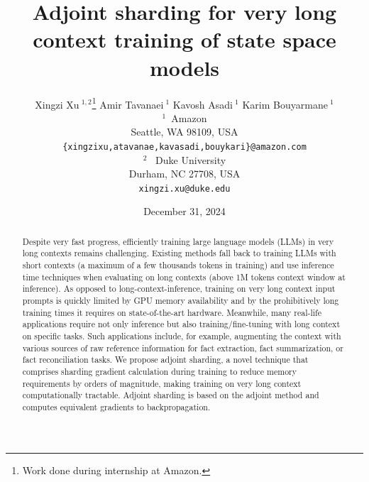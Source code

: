 \documentclass{article}
\title{Adjoint sharding for very long context training of state space models}
\author{
    Xingzi Xu$\ ^{1,2}$\thanks {Work done during internship at Amazon.}
    \And
    Amir Tavanaei$\ ^{1}$
    \And 
    Kavosh Asadi$\ ^{1}$
    \And 
    Karim Bouyarmane$\ ^{1}$
    \AND\\
    $^{1}$\ Amazon \\ Seattle, WA 98109, USA \\ \texttt{\{xingzixu,atavanae,kavasadi,bouykari\}@amazon.com}
    \And \\
    $^{2}$ \ Duke University \\ Durham, NC 27708, USA
    \\\texttt{xingzi.xu@duke.edu}
}
\begin{document}
\makeatletter
\renewcommand{\today}{December 31, 2024}
\makeatother
\date{\today}
\maketitle

\vspace{2em}  %
\setcounter{footnote}{2}

\begin{abstract}
Despite very fast progress, efficiently training large language models (LLMs) in very long contexts remains challenging.
Existing methods fall back to training LLMs with short contexts (a maximum of a few thousands tokens in training) and use inference time techniques when evaluating on long contexts (above 1M tokens context window at inference). 
As opposed to long-context-inference, training on very long context input prompts is quickly limited by GPU memory availability and by the prohibitively long training times it requires on state-of-the-art hardware.
Meanwhile, many real-life applications require not only inference but also training/fine-tuning with long context on specific tasks. Such applications include, for example, augmenting the context with various sources of raw reference information for fact extraction, fact summarization, or fact reconciliation tasks. 
We propose adjoint sharding, a novel technique that comprises sharding gradient calculation during training to reduce memory requirements by orders of magnitude, making training on very long context computationally tractable. Adjoint sharding is based on the adjoint method and computes equivalent gradients to backpropagation.

\end{abstract}
\end{document}

